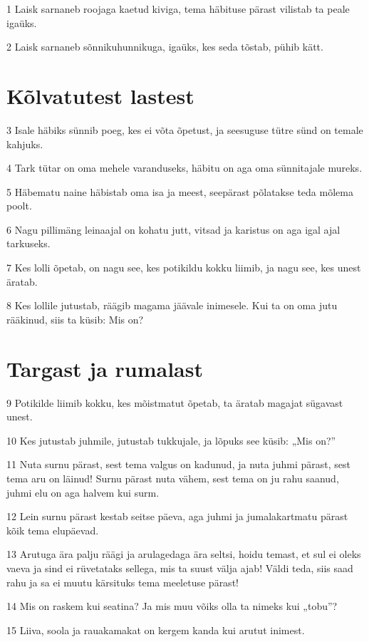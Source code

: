 \par 1 Laisk sarnaneb roojaga kaetud kiviga, tema häbituse pärast vilistab ta peale igaüks.
\par 2 Laisk sarnaneb sõnnikuhunnikuga, igaüks, kes seda tõstab, pühib kätt.

\section*{Kõlvatutest lastest}

\par 3 Isale häbiks sünnib poeg, kes ei võta õpetust, ja seesuguse tütre sünd on temale kahjuks.
\par 4 Tark tütar on oma mehele varanduseks, häbitu on aga oma sünnitajale mureks.
\par 5 Häbematu naine häbistab oma isa ja meest, seepärast põlatakse teda mõlema poolt.
\par 6 Nagu pillimäng leinaajal on kohatu jutt, vitsad ja karistus on aga igal ajal tarkuseks.
\par 7 Kes lolli õpetab, on nagu see, kes potikildu kokku liimib, ja nagu see, kes unest äratab.
\par 8 Kes lollile jutustab, räägib magama jäävale inimesele. Kui ta on oma jutu rääkinud, siis ta küsib: Mis on?

\section*{Targast ja rumalast}

\par 9 Potikilde liimib kokku, kes mõistmatut õpetab, ta äratab magajat sügavast unest.
\par 10 Kes jutustab juhmile, jutustab tukkujale, ja lõpuks see küsib: „Mis on?”
\par 11 Nuta surnu pärast, sest tema valgus on kadunud, ja nuta juhmi pärast, sest tema aru on läinud! Surnu pärast nuta vähem, sest tema on ju rahu saanud, juhmi elu on aga halvem kui surm.
\par 12 Lein surnu pärast kestab seitse päeva, aga juhmi ja jumalakartmatu pärast kõik tema elupäevad.
\par 13 Arutuga ära palju räägi ja arulagedaga ära seltsi, hoidu temast, et sul ei oleks vaeva ja sind ei rüvetataks sellega, mis ta suust välja ajab! Väldi teda, siis saad rahu ja sa ei muutu kärsituks tema meeletuse pärast!
\par 14 Mis on raskem kui seatina? Ja mis muu võiks olla ta nimeks kui „tobu”?
\par 15 Liiva, soola ja rauakamakat on kergem kanda kui arutut inimest.

